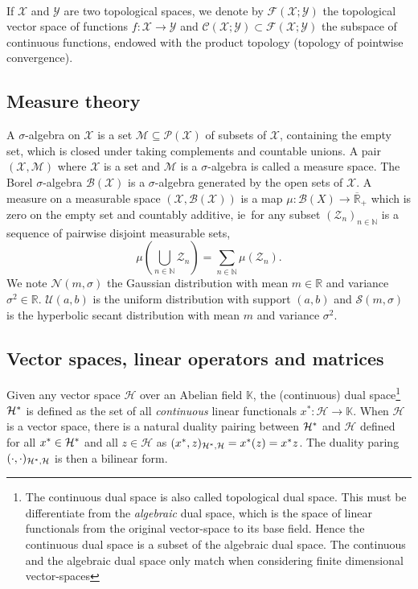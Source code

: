 \paragraph{}
If $\mathcal{X}$ and $\mathcal{Y}$ are two topological spaces, we denote by
$\mathcal{F}(\mathcal{X};\mathcal{Y})$ the topological vector space of
functions $f:\mathcal{X}\to\mathcal{Y}$ and
$\mathcal{C}(\mathcal{X};\mathcal{Y}) \subset
\mathcal{F}(\mathcal{X};\mathcal{Y})$ the subspace of continuous functions,
endowed with the product topology (topology of pointwise convergence).

\subsection{Measure theory}
A $\sigma$-algebra on $\mathcal{X}$ is a set
$\mathcal{M}\subseteq\mathcal{P}(\mathcal{X})$ of subsets of $\mathcal{X}$,
containing the empty set, which is closed under taking complements and
countable unions. A pair $(\mathcal{X},\mathcal{M})$ where $\mathcal{X}$ is a
set and $\mathcal{M}$ is a $\sigma$-algebra is called a measure space. The
Borel $\sigma$-algebra $\mathcal{B}(\mathcal{X})$ is a $\sigma$-algebra
generated by the open sets of $\mathcal{X}$. A measure on a measurable space
$(\mathcal{X},\mathcal{B}(\mathcal{X}))$ is a map $\mu: \mathcal{B}(X) \to
\overline{\mathbb{R}}_+$ which is zero on the empty set and countably additive,
\acs{ie}~for any subset $(\mathcal{Z}_n)_{n\in\mathbb{N}}$ is a sequence of
pairwise disjoint measurable sets, 
\begin{dmath*}
    \mu\left(\bigcup_{n\in\mathbb{N}}\mathcal{Z}_n\right) =
    \sum_{n\in\mathbb{N}}\mu(\mathcal{Z}_n).
\end{dmath*}
We note $\mathcal{N}(m, \sigma)$ the Gaussian distribution with
mean $m\in\mathbb{R}$ and variance $\sigma^2\in\mathbb{R}$. $\mathcal{U}(a, b)$
is the uniform distribution with support $(a, b)$ and $\mathcal{S}(m, \sigma)$
is the hyperbolic secant distribution with mean $m$ and variance $\sigma^2$.

\subsection{Vector spaces, linear operators and matrices}
Given any vector space $\mathcal{H}$ over an Abelian field $\mathbb{K}$, the
(continuous) dual space\footnote{The continuous dual space is also called
topological dual space. This must be differentiate from the \emph{algebraic}
dual space, which is the space of linear functionals from the original
vector-space to its base field. Hence the continuous dual space is a subset of
the algebraic dual space. The continuous and the algebraic dual space only
match when considering finite dimensional vector-spaces} $\mathcal{H}^*$
is defined as the set of all \emph{continuous} linear functionals $x^*:
\mathcal{H} \to \mathbb{K}$. When $\mathcal{H}$ is a vector space, there is a
natural duality pairing between $\mathcal{H}^*$ and $\mathcal{H}$
defined for all $x^*\in\mathcal{H}^*$ and all $z\in\mathcal{H}$
as $(x^*, z)_{\mathcal{H}^*, \mathcal{H}} = x^*(z)
= x^* z$. The duality paring $(\cdot,
\cdot)_{\mathcal{H}^*,\mathcal{H}}$ is then a bilinear form.
